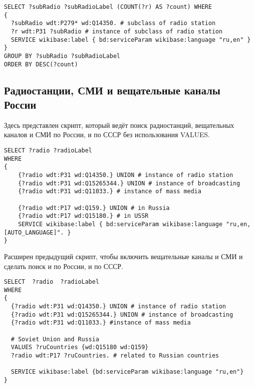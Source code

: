 \begin{lstlisting}
SELECT ?subRadio ?subRadioLabel (COUNT(?r) AS ?count) WHERE
{
  ?subRadio wdt:P279* wd:Q14350. # subclass of radio station
  ?r wdt:P31 ?subRadio # instance of subclass of radio station 
  SERVICE wikibase:label { bd:serviceParam wikibase:language "ru,en" }
}
GROUP BY ?subRadio ?subRadioLabel
ORDER BY DESC(?count)\end{lstlisting}%


\newpage

\subsection{Радиостанции, СМИ и вещательные каналы России}

Здесь представлен скрипт, который ведёт поиск радиостанций, вещательных каналов и СМИ по России, и по СССР без использования VALUES.

\begin{lstlisting}
SELECT ?radio ?radioLabel
WHERE
{
    {?radio wdt:P31 wd:Q14350.} UNION # instance of radio station
    {?radio wdt:P31 wd:Q15265344.} UNION # instance of broadcasting
    {?radio wdt:P31 wd:Q11033.} # instance of mass media
    
    {?radio wdt:P17 wd:Q159.} UNION # in Russia
    {?radio wdt:P17 wd:Q15180.} # in USSR
    SERVICE wikibase:label { bd:serviceParam wikibase:language "ru,en,[AUTO_LANGUAGE]". }
}\end{lstlisting}%


Расширен предыдущий скрипт, чтобы включить вещательные каналы и СМИ и сделать поиск и по России, и по СССР.

\begin{lstlisting}
SELECT  ?radio  ?radioLabel
WHERE
{
  {?radio wdt:P31 wd:Q14350.} UNION # instance of radio station
  {?radio wdt:P31 wd:Q15265344.} UNION # instance of broadcasting
  {?radio wdt:P31 wd:Q11033.} #instance of mass media
  
  # Soviet Union and Russia
  VALUES ?ruCountries {wd:Q15180 wd:Q159}
  ?radio wdt:P17 ?ruCountries. # related to Russian countries
  
  SERVICE wikibase:label {bd:serviceParam wikibase:language "ru,en"}
}\end{lstlisting}%


